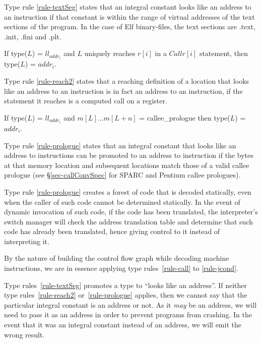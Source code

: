 Type rule \ref{rule-textSeg} states that an integral constant looks 
like an address to an instruction if that constant is within the
range of virtual addresses of the text sections of the program. 
In the case of Elf binary-files, the text sections are .text, 
.init, .fini and .plt. 

\begin{typerule}
If type($L$) = $ll_{addr_i}$ and $L$ uniquely reaches $r[i]$ in 
a $Call r[i]$ statement, then type($L$) = $addr_i$.
\label{rule-reach2}
\end{typerule}

Type rule \ref{rule-reach2} states that a reaching definition of a 
location that looks like an address to an instruction is in fact
an address to an instruction, if the statement it reaches is a 
computed call on a register.

\begin{typerule}
If type($L$) = $ll_{addr_i}$ and $m[L] \ldots m[L+n]$ = callee\_prologue
then type($L$) = $addr_i$.
\label{rule-prologue}
\end{typerule}

Type rule \ref{rule-prologue} states that an integral constant that 
looks like an address to instructions can be promoted to an 
address to instruction if the bytes at that memory location and subsequent 
locations match those of a valid callee prologue (see 
\S\ref{sec-callConvSpec} for SPARC and Pentium callee prologues).

Type rule \ref{rule-prologue} creates a forest of code that is decoded
statically, even when the caller of such code cannot be determined
statically.  In the event of dynamic invocation of such code, 
if the code has been translated, the interpreter's switch manager
will check the address translation table and determine that such
code has already been translated, hence giving control to it 
instead of interpreting it. 

By the nature of building the control flow graph while decoding 
machine instructions, we are in essence applying type rules~\ref{rule-call} 
to \ref{rule-jcond}.  

Type rules~\ref{rule-textSeg} promotes a type to ``looks like an 
address''.  If neither type rules~\ref{rule-reach2} or~\ref{rule-prologue} 
applies, then we cannot say that the particular integral constant is an 
address or not.  As it \emph{may} be an address, we will need to 
pass it as an address in order to prevent programs from crashing. 
In the event that it was an integral constant instead of an address, 
we will emit the wrong result.  

